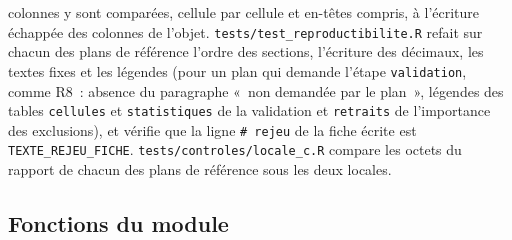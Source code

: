 \documentclass[a4paper,11pt]{article}
\newcommand{\code}[1]{\texttt{\small #1}}
\begin{document}
{colonnes y sont comparées, cellule par cellule et en-têtes compris, à
l'écriture échappée des colonnes de l'objet. \code{tests/test\_reproductibilite.R}
refait sur chacun des plans de référence l'ordre des sections, l'écriture des
décimaux, les textes fixes et les légendes (pour un plan qui demande l'étape
\code{validation}, comme R8~: absence du paragraphe «~non demandée par le
plan~», légendes des tables \code{cellules} et \code{statistiques} de la
validation et \code{retraits} de l'importance des exclusions), et vérifie que la ligne
\code{\# rejeu} de la fiche écrite est \code{TEXTE\_REJEU\_FICHE}.
\code{tests/controles/locale\_c.R} compare les octets du rapport de chacun des plans de référence sous
les deux locales.\par}

\subsection{Fonctions du module}
\label{sec:fonctions-rapport}
\end{document}
